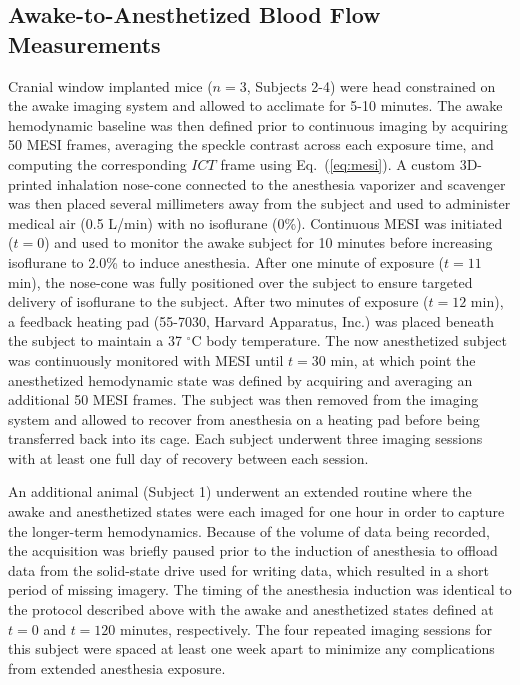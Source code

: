 \documentclass[12pt]{spieman}
\begin{document}
\begin{spacing}{2}

\subsection{Awake-to-Anesthetized Blood Flow Measurements}

Cranial window implanted mice ($n = 3$, Subjects 2-4) were head constrained on the awake imaging system and allowed to acclimate for 5-10 minutes. The awake hemodynamic baseline was then defined prior to continuous imaging by acquiring 50 MESI frames, averaging the speckle contrast across each exposure time, and computing the corresponding $ICT$ frame using Eq.~(\ref{eq:mesi}). A custom 3D-printed inhalation nose-cone connected to the anesthesia vaporizer and scavenger was then placed several millimeters away from the subject and used to administer medical air (0.5 L/min) with no isoflurane (0\%). Continuous MESI was initiated ($t = 0$) and used to monitor the awake subject for 10 minutes before increasing isoflurane to 2.0\% to induce anesthesia. After one minute of exposure ($t = 11$ min), the nose-cone was fully positioned over the subject to ensure targeted delivery of isoflurane to the subject. After two minutes of exposure ($t = 12$ min), a feedback heating pad (55-7030, Harvard Apparatus, Inc.) was placed beneath the subject to maintain a 37 $^\circ$C body temperature. The now anesthetized subject was continuously monitored with MESI until $t = 30$ min, at which point the anesthetized hemodynamic state was defined by acquiring and averaging an additional 50 MESI frames. The subject was then removed from the imaging system and allowed to recover from anesthesia on a heating pad before being transferred back into its cage. Each subject underwent three imaging sessions with at least one full day of recovery between each session.

An additional animal (Subject 1) underwent an extended routine where the awake and anesthetized states were each imaged for one hour in order to capture the longer-term hemodynamics. Because of the volume of data being recorded, the acquisition was briefly paused prior to the induction of anesthesia to offload data from the solid-state drive used for writing data, which resulted in a short period of missing imagery. The timing of the anesthesia induction was identical to the protocol described above with the awake and anesthetized states defined at $t = 0$ and $t = 120$ minutes, respectively. The four repeated imaging sessions for this subject were spaced at least one week apart to minimize any complications from extended anesthesia exposure.


\end{spacing}
\end{document}
